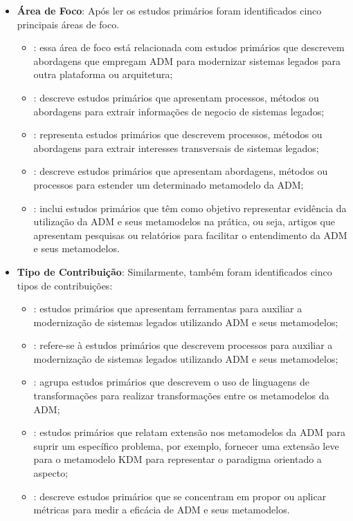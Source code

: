\begin{itemize}
\item \textbf{Área de Foco}: Após ler os estudos primários foram identificados cinco principais áreas de foco. 
    
    \begin{itemize}
        \item {}: essa área de foco está relacionada com estudos primários que descrevem abordagens que empregam ADM para modernizar sistemas legados para outra plataforma ou arquitetura;
        \item {}: descreve estudos primários que apresentam processos, métodos ou abordagens para extrair informações de negocio de sistemas legados;
        \item {}: representa estudos primários que descrevem processos, métodos ou abordagens para extrair interesses transversais de sistemas legados;
        \item {}: descreve estudos primários que apresentam abordagens, métodos ou processos para estender um determinado metamodelo da ADM;
        \item {}: inclui estudos primários que têm como objetivo representar evidência da utilização da ADM e seus metamodelos na prática, ou seja, artigos que apresentam pesquisas ou relatórios para facilitar o entendimento da ADM e seus metamodelos.
    \end{itemize}
    
    \item \textbf{Tipo de Contribuição}: Similarmente, também foram identificados cinco tipos de contribuições:
        
        \begin{itemize}
            \item {}: estudos primários que apresentam ferramentas para auxiliar a modernização de sistemas legados utilizando ADM e seus metamodelos;
            \item {}: refere-se à estudos primários que descrevem processos para auxiliar a modernização de sistemas legados utilizando ADM e seus metamodelos;
            \item {}: agrupa estudos primários que descrevem o uso de linguagens de transformações para realizar transformações entre os metamodelos da ADM;
            \item {}: estudos primários que relatam extensão nos metamodelos da ADM para suprir um específico problema, por exemplo, fornecer uma extensão leve para o metamodelo KDM para representar o paradigma orientado a aspecto;
            \item {}: descreve estudos primários que se concentram em propor ou aplicar métricas para medir a eficácia de ADM e seus metamodelos.
        \end{itemize}
        

\end{itemize}

